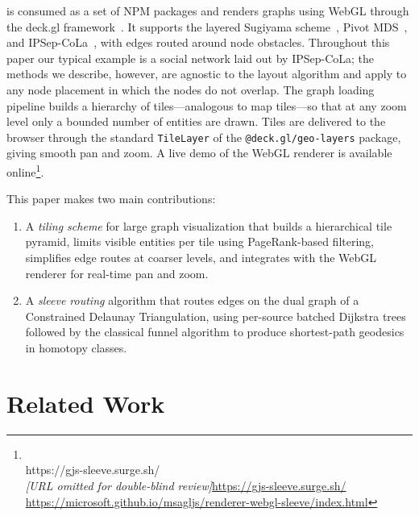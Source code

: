 \documentclass[a4paper,USenglish,anonymous]{gd-lipics-v3}
\newcommand{\msagljs}{\textsf{\libname}}
\newcommand{\anondemowebgl}{https://gjs-sleeve.surge.sh/}%
\newcommand{\anondemourl}[2]{%
  \ifthenelse{\boolean{gdanonymous}}%
    {\ifx\\#1\\\textit{[URL omitted for double-blind review]}\else\url{#1}\fi}%
    {\url{#2}}%
}
\begin{document}
\msagljs{} is consumed as a set of NPM packages and renders graphs
using WebGL through the deck.gl framework~\cite{deckgl}. It supports
the layered Sugiyama scheme~\cite{sugiyama1981}, Pivot
MDS~\cite{brandes2007eigensolver}, and
IPSep-CoLa~\cite{dwyer2006ipsepcola}, with edges routed around node
obstacles. Throughout this paper our typical example is a social
network laid out by IPSep-CoLa; the methods we describe, however, are
agnostic to the layout algorithm and apply to any node placement in
which the nodes do not overlap. The graph loading pipeline builds a
hierarchy of tiles---analogous to map tiles---so that at any zoom
level only a bounded number of entities are drawn. Tiles are delivered
to the browser through the standard \texttt{TileLayer} of the
\texttt{@deck.gl/geo-layers} package, giving smooth pan and zoom. A live
demo of the WebGL renderer is available
online\footnote{\anondemourl{\anondemowebgl}{https://microsoft.github.io/msagljs/renderer-webgl-sleeve/index.html}}.

This paper makes two main contributions:
\begin{enumerate}
\item A \emph{tiling scheme} for large graph visualization that builds a hierarchical tile pyramid, limits visible entities per tile using PageRank-based filtering, simplifies edge routes at coarser levels, and integrates with the WebGL renderer for real-time pan and zoom.
\item A \emph{sleeve routing} algorithm that routes edges on the dual graph of a Constrained Delaunay Triangulation, using per-source batched Dijkstra trees followed by the classical funnel algorithm to produce shortest-path geodesics in homotopy classes.
\end{enumerate}

\section{Related Work}
\label{sec:related}
\end{document}
